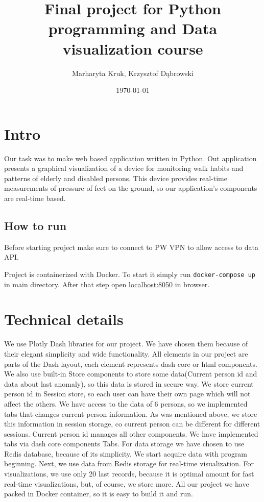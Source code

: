 \documentclass{article}
\title{Final project for Python programming and Data visualization course}
\author{Marharyta Kruk, Krzysztof Dąbrowski}
\date{\today}
\begin{document}
\maketitle
\tableofcontents
\newpage

\section{Intro}
Our task was to make web based application written in Python. Out application presents a graphical visualization of a device for monitoring walk habits and patterns of elderly and disabled persons.
This device provides real-time measurements of pressure of feet on the ground, so our application's components are real-time based.
\subsection{How to run}
Before starting project make sure to connect to PW VPN to allow access to data API.

Project is containerized with Docker. To start it simply run \texttt{docker-compose up} in main directory. After that step open \href{http://localhost:8050}{localhost:8050} in browser.

\section{Technical details}
We use Plotly Dash libraries for our project. We have chosen them because of their elegant simplicity and wide functionality. All elements in our project are parts of the Dash layout, each element represents dash core or html components. We also use built-in Store components to store some data(Current person id and data about last anomaly), so this data is stored in secure way. We store current person id in Session store, so each user can have their own page which will not affect the others.
\newline
We have access to the data of 6 persons, so we implemented tabs that changes current person information. As was mentioned above, we store this information in session storage, co current person can be different for different sessions. Current person id manages all other components. We have implemented tabs via dash core components Tabs.
\newline
For data storage we have chosen to use Redis database, because of its simplicity. We start acquire data with program beginning. Next, we use data from Redis storage for real-time visualization. For visualizations, we use only 20 last records, because it is optimal amount for fast real-time visualizations, but, of course, we store more.
\newline
All our project we have packed in Docker container, so it is easy to build it and run.
\end{document}

